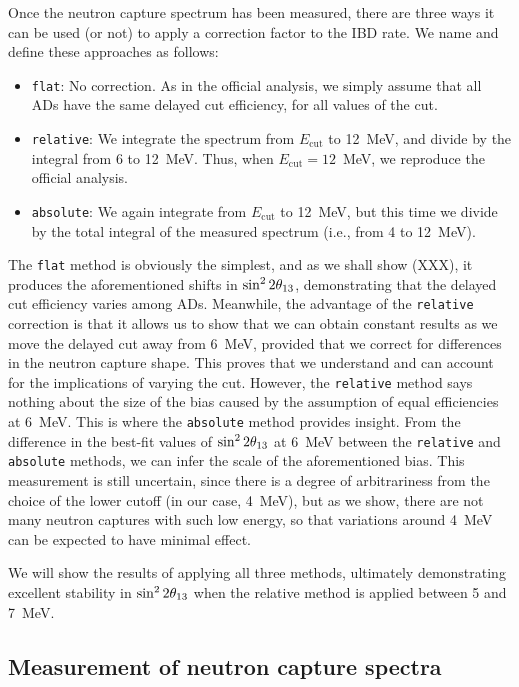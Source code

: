 \documentclass[../thesis.tex]{subfiles}
\begin{document}
Once the neutron capture spectrum has been measured, there are three ways it can be used (or not) to apply a correction factor to the IBD rate. We name and define these approaches as follows:

\begin{itemize}
\item \texttt{flat}: No correction. As in the official analysis, we simply assume that all ADs have the same delayed cut efficiency, for all values of the cut.
\item \texttt{relative}: We integrate the spectrum from $E_{\mathrm{cut}}$ to 12~MeV, and divide by the integral from 6 to 12~MeV. Thus, when $E_{\mathrm{cut}} = 12$~MeV, we reproduce the official analysis.
\item \texttt{absolute}: We again integrate from $E_{\mathrm{cut}}$ to 12~MeV, but this time we divide by the total integral of the measured spectrum (i.e., from 4 to 12~MeV).
\end{itemize}

The \texttt{flat} method is obviously the simplest, and as we shall show (XXX), it produces the aforementioned shifts in $\sin^2 2\theta_{13}$, demonstrating that the delayed cut efficiency varies among ADs. Meanwhile, the advantage of the \texttt{relative} correction is that it allows us to show that we can obtain constant results as we move the delayed cut away from 6~MeV, provided that we correct for differences in the neutron capture shape. This proves that we understand and can account for the implications of varying the cut. However, the \texttt{relative} method says nothing about the size of the bias caused by the assumption of equal efficiencies at 6~MeV. This is where the \texttt{absolute} method provides insight. From the difference in the best-fit values of $\sin^2 2\theta_{13}$ at 6~MeV between the \texttt{relative} and \texttt{absolute} methods, we can infer the scale of the aforementioned bias. This measurement is still uncertain, since there is a degree of arbitrariness from the choice of the lower cutoff (in our case, 4~MeV), but as we show, there are not many neutron captures with such low energy, so that variations around 4~MeV can be expected to have minimal effect.

We will show the results of applying all three methods, ultimately demonstrating excellent stability in $\sin^2 2\theta_{13}$ when the relative method is applied between 5 and 7~MeV.

\subsection{Measurement of neutron capture spectra}
\label{sec:cutVarDelCutSpecMeas}
\end{document}
